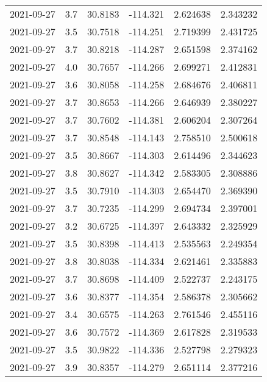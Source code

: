 \begin{tabular}{lrrrrr}
2021-09-27 &       3.7 &  30.8183 &  -114.321 &         2.624638 &         2.343232 \\
2021-09-27 &       3.5 &  30.7518 &  -114.251 &         2.719399 &         2.431725 \\
2021-09-27 &       3.7 &  30.8218 &  -114.287 &         2.651598 &         2.374162 \\
2021-09-27 &       4.0 &  30.7657 &  -114.266 &         2.699271 &         2.412831 \\
2021-09-27 &       3.6 &  30.8058 &  -114.258 &         2.684676 &         2.406811 \\
2021-09-27 &       3.7 &  30.8653 &  -114.266 &         2.646939 &         2.380227 \\
2021-09-27 &       3.7 &  30.7602 &  -114.381 &         2.606204 &         2.307264 \\
2021-09-27 &       3.7 &  30.8548 &  -114.143 &         2.758510 &         2.500618 \\
2021-09-27 &       3.5 &  30.8667 &  -114.303 &         2.614496 &         2.344623 \\
2021-09-27 &       3.8 &  30.8627 &  -114.342 &         2.583305 &         2.308886 \\
2021-09-27 &       3.5 &  30.7910 &  -114.303 &         2.654470 &         2.369390 \\
2021-09-27 &       3.7 &  30.7235 &  -114.299 &         2.694734 &         2.397001 \\
2021-09-27 &       3.2 &  30.6725 &  -114.397 &         2.643332 &         2.325929 \\
2021-09-27 &       3.5 &  30.8398 &  -114.413 &         2.535563 &         2.249354 \\
2021-09-27 &       3.8 &  30.8038 &  -114.334 &         2.621461 &         2.335883 \\
2021-09-27 &       3.7 &  30.8698 &  -114.409 &         2.522737 &         2.243175 \\
2021-09-27 &       3.6 &  30.8377 &  -114.354 &         2.586378 &         2.305662 \\
2021-09-27 &       3.4 &  30.6575 &  -114.263 &         2.761546 &         2.455116 \\
2021-09-27 &       3.6 &  30.7572 &  -114.369 &         2.617828 &         2.319533 \\
2021-09-27 &       3.5 &  30.9822 &  -114.336 &         2.527798 &         2.279323 \\
2021-09-27 &       3.9 &  30.8357 &  -114.279 &         2.651114 &         2.377216 \\

\end{tabular}
